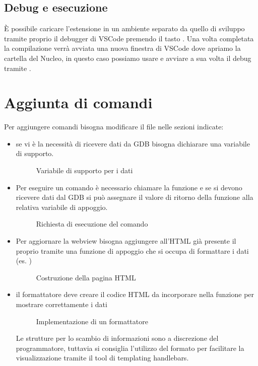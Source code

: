 \subsection*{Debug e esecuzione}
È possibile caricare l'estensione in un ambiente separato da quello di sviluppo tramite proprio il debugger di VSCode premendo il tasto . Una volta completata la compilazione verrà avviata una nuova finestra di VSCode dove apriamo la cartella del Nucleo, in questo caso possiamo usare  e avviare a sua volta il debug tramite .

\section{Aggiunta di comandi}
Per aggiungere comandi bisogna modificare il file  nelle sezioni indicate:
\begin{itemize}
    \item {
        se vi è la necessità di ricevere dati da GDB bisogna dichiarare una variabile di supporto.
        \begin{figure}[H]
            
            \caption{Variabile di supporto per i dati}
        \end{figure}
    }
    \item {
        Per eseguire un comando è necessario chiamare la funzione \linebreak {} e se si devono ricevere dati dal GDB si può assegnare il valore di ritorno della funzione alla relativa variabile di appoggio.
        \begin{figure}[H]
            
            \caption{Richiesta di esecuzione del comando}
        \end{figure}
    }
    \item {
        Per aggiornare la webview bisogna aggiungere all'HTML già presente il proprio tramite  una funzione di appoggio che si occupa di formattare i dati (es. )
        \begin{figure}[H]
            
            \caption{Costruzione della pagina HTML}
        \end{figure}
    }
    \item {
        il formattatore deve creare il codice HTML da incorporare nella funzione  per mostrare correttamente i dati
        \begin{figure}[H]
            
            \caption{Implementazione di un formattatore}
        \end{figure}
        Le strutture per lo scambio di informazioni sono a discrezione del programmatore, tuttavia si consiglia l'utilizzo del formato  per facilitare la visualizzazione tramite il tool di templating handlebars\cite{handlebars}.
    }
\end{itemize}
